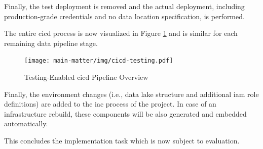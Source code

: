 Finally, the test deployment is removed and the actual deployment, including production-grade credentials and no data location specification, is performed.

The entire \ac{cicd} process is now visualized in Figure \ref{fig:5-cicd-testing} and is similar for each remaining data pipeline stage.

\begin{figure}[h!]
	\centering
	\texttt{[image: main-matter/img/cicd-testing.pdf]}
	\caption{Testing-Enabled \ac{cicd} Pipeline Overview}
	\label{fig:5-cicd-testing}
\end{figure}

Finally, the environment changes (i.e., data lake structure and additional \ac{iam} role definitions) are added to the \ac{iac} process of the project. In case of an infrastructure rebuild, these components will be also generated and embedded automatically.

This concludes the implementation task which is now subject to evaluation.


